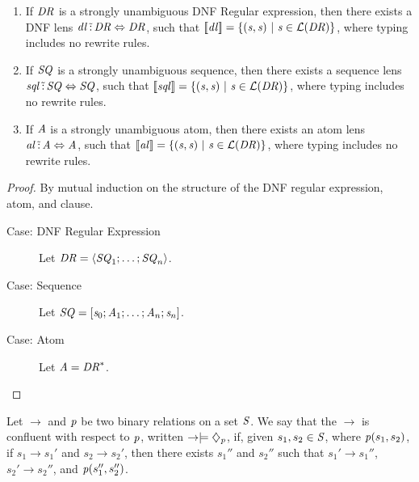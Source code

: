 \documentclass[numbers]{sigplanconf}
\begin{document}
\begin{lemma}
  \label{lem:strongly-unambiguous-identity-expressible}
  \leavevmode
  \begin{enumerate}
  \item If $\mathit{DR}$ is a strongly unambiguous DNF Regular expression, then
    there exists a DNF lens $\mathit{dl} \,\tilde{:}\, \mathit{DR} \Leftrightarrow
    \mathit{DR}$,
    such that $[ \! [\mathit{dl}] \! ]=
    \{(\mathit{s},\mathit{s})~|~\mathit{s}\in\mathcal{L}(\mathit{DR})\}$, where
    \DNFLens{} typing includes no rewrite rules.
  \item If $\mathit{SQ}$ is a strongly unambiguous sequence, then
    there exists a sequence lens $\mathit{sql} \,\tilde{:}\, \mathit{SQ}
    \Leftrightarrow \mathit{SQ}$,
    such that $[ \! [\mathit{sql}] \! ]=
    \{(\mathit{s},\mathit{s})~|~\mathit{s}\in\mathcal{L}(\mathit{DR})\}$, where
    \SequenceLens{} typing includes no rewrite rules.
  \item If $\mathit{A}$ is a strongly unambiguous atom, then
    there exists an atom lens $\mathit{al} \,\tilde{:}\, \mathit{A}
    \Leftrightarrow
    \mathit{A}$, such that $[ \! [\mathit{al}] \! ]=
    \{(\mathit{s},\mathit{s})~|~\mathit{s}\in\mathcal{L}(\mathit{DR})\}$, where
    \AtomLens{} typing includes no rewrite rules.
  \end{enumerate}
\end{lemma}
\begin{proof}
  By mutual induction on the structure of the DNF regular expression,
  atom, and clause.
  \begin{description}
  \item[Case: DNF Regular Expression] Let $\mathit{DR} = \langle\mathit{SQ}_1;\ldots;\mathit{SQ}_n\rangle$.
  \item[Case: Sequence] Let $\mathit{SQ} =
    [\mathit{s}_0;\mathit{A}_1;\ldots;\mathit{A}_n;\mathit{s}_n]$.
  \item[Case: Atom] Let $\mathit{A} = {\mathit{DR}}^*$.
  \end{description}
\end{proof}

\begin{definition}
  Let $\rightarrow$ and $\mathit{p}$ be two binary relations on a set $\mathit{S}$.
  We say that the $\rightarrow$ is confluent with respect to
  $\mathit{p}$, written
  $\rightarrow\models\diamondsuit_{\mathit{p}}$, if, given $s_1,s_2\in\mathit{S}$,
  where $\mathit{p}(s_1,s_2)$, if $s_1\rightarrow s_1'$ and
  $s_2 \rightarrow s_2'$, then there exists $s_1''$ and $s_2''$ such that
  $s_1'\rightarrow s_1''$, $s_2' \rightarrow s_2''$, and
  $\mathit{p}(s_1'',s_2'')$.
\end{definition}
\end{document}
